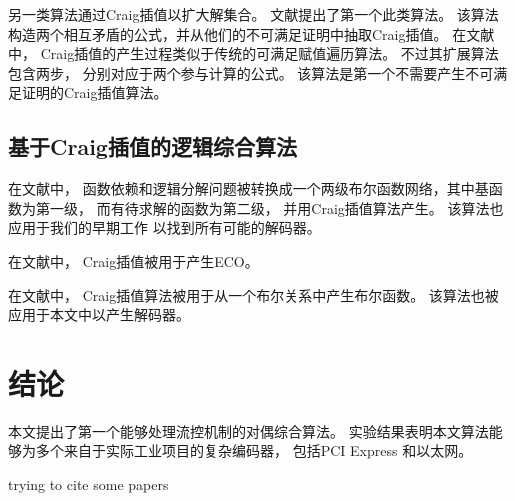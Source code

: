 另一类算法通过Craig插值以扩大解集合。
文献提出了第一个此类算法。
该算法构造两个相互矛盾的公式，并从他们的不可满足证明中抽取Craig插值。
在文献中，
Craig插值的产生过程类似于传统的可满足赋值遍历算法。
不过其扩展算法包含两步，
分别对应于两个参与计算的公式。
该算法是第一个不需要产生不可满足证明的Craig插值算法。

\subsection{基于Craig插值的逻辑综合算法}
在文献中，
函数依赖和逻辑分解问题被转换成一个两级布尔函数网络，其中基函数为第一级，
而有待求解的函数为第二级，
并用Craig插值算法产生。
该算法也应用于我们的早期工作 以找到所有可能的解码器。

在文献中，
Craig插值被用于产生ECO。

在文献中，
Craig插值算法被用于从一个布尔关系中产生布尔函数。
该算法也被应用于本文中以产生解码器。


\section{结论}\label{sec_conclude}

本文提出了第一个能够处理流控机制的对偶综合算法。
实验结果表明本文算法能够为多个来自于实际工业项目的复杂编码器，
包括PCI Express  和以太网。

trying to cite some papers

\cite{DBLP:journals/corr/cond-mat-0111153}
\cite{DBLP:conf/apweb/QinSKD14}

\cite{Yongzhi_Wang}

\cite{DBLP:conf/pst/BenjaminA08}

